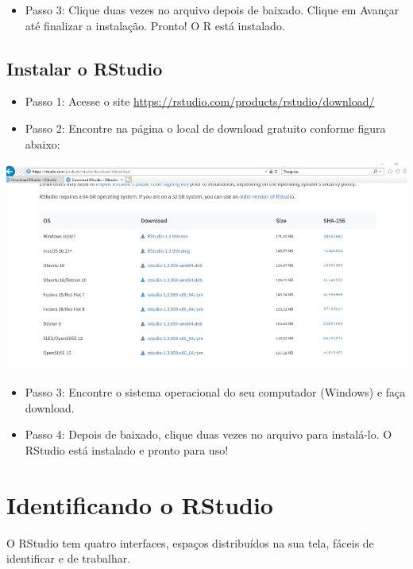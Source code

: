 \documentclass[
  10pt,
  brazil,
  a4paper,
  twoside, notitlepage, openright]{book}
\providecommand{\tightlist}{%
  \setlength{\itemsep}{0pt}\setlength{\parskip}{0pt}}
\begin{document}
\begin{itemize}
\tightlist
\item
  Passo 3: Clique duas vezes no arquivo depois de baixado. Clique em Avançar até finalizar a instalação. Pronto! O R está instalado.
\end{itemize}

\hypertarget{instalar-o-rstudio-2}{%
\subsection{Instalar o RStudio}\label{instalar-o-rstudio-2}}

\begin{itemize}
\tightlist
\item
  Passo 1: Acesse o site \url{https://rstudio.com/products/rstudio/download/}\\
\item
  Passo 2: Encontre na página o local de download gratuito conforme figura abaixo:
\end{itemize}

\includegraphics[width=13.54in]{img/inst_1_rstudio}

\begin{itemize}
\tightlist
\item
  Passo 3: Encontre o sistema operacional do seu computador (Windows) e faça download.
\item
  Passo 4: Depois de baixado, clique duas vezes no arquivo para instalá-lo. O RStudio está instalado e pronto para uso!
\end{itemize}

\hypertarget{rstudio}{%
\section{Identificando o RStudio}\label{rstudio}}

O RStudio tem quatro interfaces, espaços distribuídos na sua tela, fáceis de identificar e de trabalhar.
\end{document}
